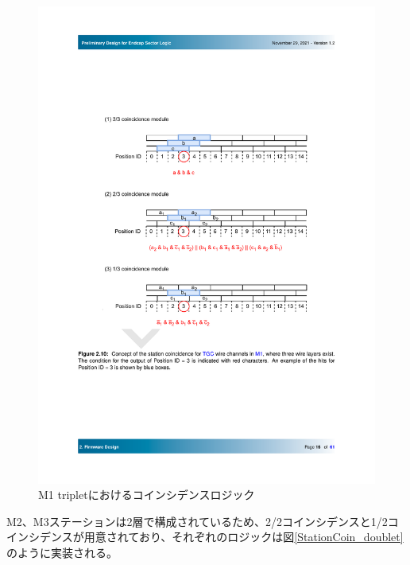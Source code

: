 \begin{figure} 
    \centering
    \includegraphics[width=16cm]{fig/SL/StationCoin_wire.pdf}
    \caption[M1 tripletにおけるコインシデンスロジック]{M1 tripletにおけるコインシデンスロジック}
    \label{StationCoin_wire}
\end{figure}

M2、M3ステーションは2層で構成されているため、2/2コインシデンスと1/2コインシデンスが用意されており、それぞれのロジックは図\ref{StationCoin_doublet}のように実装される。
    
